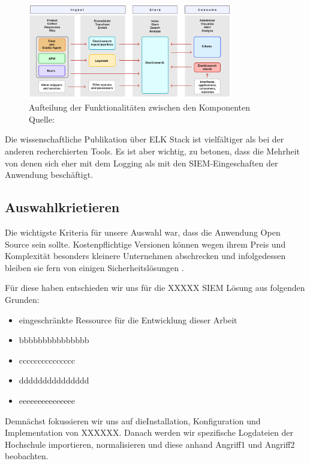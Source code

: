 \begin{figure}[H]
   \centering
   \includegraphics[width=0.8\textwidth]{assets/2_p9.png}
   \caption{Aufteilung der Funktionalitäten zwischen den Komponenten\\Quelle: \citep{elastic_docs}}
   \centering
\end{figure}

Die wissenschaftliche Publikation über ELK Stack ist vielfältiger als bei der anderen recherchierten Tools. Es ist aber wichtig, zu betonen, dass die Mehrheit von denen sich eher mit dem Logging als mit den \gls{SIEM}-Eingeschaften der Anwendung beschäftigt.


\subsection{Auswahlkrietieren}
Die wichtigste Kriteria für unsere Auswahl war, dass die Anwendung \gls{Open Source} sein sollte. Kostenpflichtige Versionen können wegen ihrem Preis und Komplexität besonders kleinere Unternehmen abschrecken und infolgedessen bleiben sie fern von einigen Sicherheitslösungen \citep{Bjork_OSSIEM}.

Für diese haben entschieden wir uns für die XXXXX \gls{SIEM} Lösung aus folgenden Grunden:

\begin{itemize}[noitemsep]
   \item eingeschränkte Ressource für die Entwicklung dieser Arbeit
   \item bbbbbbbbbbbbbbb
   \item ccccccccccccccc
   \item ddddddddddddddd
   \item eeeeeeeeeeeeeee
\end{itemize}

Demnächst fokussieren wir uns auf dieInstallation, Konfiguration und Implementation von XXXXXX. Danach werden wir spezifische Logdateien der Hochschule importieren, normalisieren und diese anhand Angriff1 und Angriff2 beobachten.